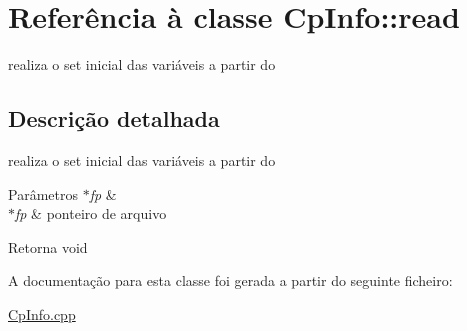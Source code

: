 \hypertarget{class_cp_info_1_1read}{}\section{Referência à classe Cp\+Info\+:\+:read}
\label{class_cp_info_1_1read}


realiza o set inicial das variáveis a partir do  




\subsection{Descrição detalhada}
realiza o set inicial das variáveis a partir do 


\begin{DoxyParams}{Parâmetros}
{\em $\ast$fp} & \\
\hline
{\em $\ast$fp} & ponteiro de arquivo \\
\hline
\end{DoxyParams}
\begin{DoxyReturn}{Retorna}
void 
\end{DoxyReturn}


A documentação para esta classe foi gerada a partir do seguinte ficheiro\+:\begin{DoxyCompactItemize}
\item 
\hyperlink{_cp_info_8cpp}{Cp\+Info.\+cpp}\end{DoxyCompactItemize}
